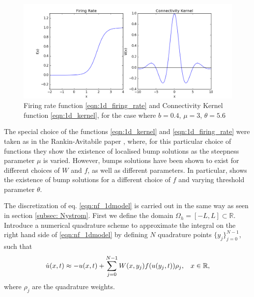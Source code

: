 \documentclass{uonmathreport}
\begin{document}
\begin{figure}
	\begin{center}
		\includegraphics[width=1\textwidth]{Figures/1D_fRate_ker_nystrom.png}
	\end{center}
	\caption{Firing rate function \ref{eqn:1d_firing_rate} and Connectivity Kernel function \ref{eqn:1d_kernel}, for the case where $b = 0.4$, $\mu = 3$, $\theta = 5.6$}
	\label{fig:fRate_ker_nystrom}
\end{figure}

The special choice of the functions \ref{eqn:1d_kernel} and \ref{eqn:1d_firing_rate} were taken as in the Rankin-Avitabile paper \cite{rankin2014continuation}, where, for this particular choice of functions they show the existence of localised bump solutions as the steepness parameter $\mu$ is varied. However, bumps solutions have been shown to exist for different choices of $W$ and $f$, as well as different parameters. In particular, \cite{LaingCarloR.2002MBia} shows the existence of bump solutions for a different choice of $f$ and varying threshold parameter $\theta$.
 
The discretization of eq. \ref{eqn:nf_1dmodel} is carried out in the same way as seen in section \ref{subsec: Nystrom}. First we define the domain $\Omega_h=[-L, L] \subset \mathbb{R}$. Introduce a numerical quadrature scheme to approximate the integral on the right hand side of \ref{eqn:nf_1dmodel} by defining $N$ quadrature points $\{y_j\}_{j=0}^{N-1}$, such that
\begin{equation}
\dot{u}(x, t) \approx -u(x, t) + \sum_{j=0}^{N-1} W(x, y_j)f(u(y_j, t))\rho_j, \hspace{3mm} x \in \mathbb{R},
\end{equation}
where $\rho_j$ are the quadrature weights.
\end{document}
